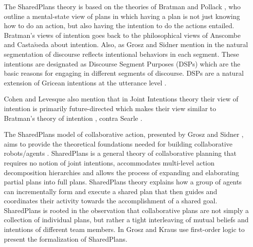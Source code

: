 The SharedPlans theory is based on the theories of Bratman and Pollack
\cite{bratman:plans-reasoning,pollack:plan-inference,pollack:plan-mental-attitudes},
who outline a mental-state view of plans in which having a plan is not just
knowing how to do an action, but also having the intention to do the actions
entailed. Bratman's views of intention goes back to the philosophical views of
Anscombe \cite{anscombe:intention} and Casta$\tilde{n}$eda
\cite{castaneda:thinking} about intention. Also, as Grosz and Sidner mention in
\cite{grosz:plans-discourse} the natural segmentation of discourse reflects
intentional behaviors in each segment. These intentions are designated as
Discourse Segment Purposes (DSPs) which are the basic reasons for engaging in
different segments of discourse. DSPs are a natural extension of Gricean
intentions at the utterance level \cite{neale:grice-language}.

Cohen and Levesque also mention that in Joint Intentions theory their view of
intention is primarily future-directed \cite{cohen:intention-commitment} which
makes their view similar to Bratman's theory of intention
\cite{bratman:intention}, contra Searle \cite{searle:collective}.

The SharedPlans model of collaborative action, presented by Grosz and Sidner
\cite{grosz:planning-acting,grosz:collaboration,grosz:plans-discourse}, aims
to provide the theoretical foundations needed for building collaborative
robots/agents \cite{grosz:collaborative-systems}. SharedPlans is a general
theory of collaborative planning that requires no notion of joint intentions,
accommodates multi-level action decomposition hierarchies and allows the process
of expanding and elaborating partial plans into full plans. SharedPlans theory
explains how a group of agents can incrementally form and execute a shared plan
that then guides and coordinates their activity towards the accomplishment of a
shared goal. SharedPlans is rooted in the observation that collaborative plans
are not simply a collection of individual plans, but rather a tight interleaving
of mutual beliefs and intentions of different team members. In
\cite{grosz:collaboration} Grosz and Kraus use first-order logic to present the
formalization of SharedPlans.

